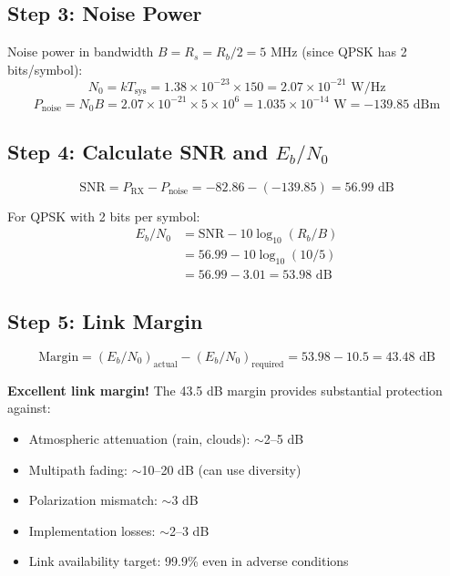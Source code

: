 \subsection*{Step 3: Noise Power}
Noise power in bandwidth $B = R_s = R_b/2 = 5$ MHz (since QPSK has 2 bits/symbol):
\begin{equation}
N_0 = k T_{\text{sys}} = 1.38 \times 10^{-23} \times 150 = 2.07 \times 10^{-21} \text{ W/Hz}
\end{equation}
\begin{equation}
P_{\text{noise}} = N_0 B = 2.07 \times 10^{-21} \times 5 \times 10^6 = 1.035 \times 10^{-14} \text{ W} = -139.85 \text{ dBm}
\end{equation}

\subsection*{Step 4: Calculate SNR and $E_b/N_0$}
\begin{equation}
\text{SNR} = P_{\text{RX}} - P_{\text{noise}} = -82.86 - (-139.85) = 56.99 \text{ dB}
\end{equation}

For QPSK with 2 bits per symbol:
\begin{align}
E_b/N_0 &= \text{SNR} - 10\log_{10}(R_b/B) \nonumber\\
&= 56.99 - 10\log_{10}(10/5) \nonumber\\
&= 56.99 - 3.01 = 53.98 \text{ dB}
\end{align}

\subsection*{Step 5: Link Margin}
\begin{equation}
\text{Margin} = (E_b/N_0)_{\text{actual}} - (E_b/N_0)_{\text{required}} = 53.98 - 10.5 = 43.48 \text{ dB}
\end{equation}

\begin{keyconcept}
\textbf{Excellent link margin!} The 43.5 dB margin provides substantial protection against:
\begin{itemize}
\item Atmospheric attenuation (rain, clouds): $\sim$2--5 dB
\item Multipath fading: $\sim$10--20 dB (can use diversity)
\item Polarization mismatch: $\sim$3 dB
\item Implementation losses: $\sim$2--3 dB
\item Link availability target: 99.9\% even in adverse conditions
\end{itemize}
\end{keyconcept}

